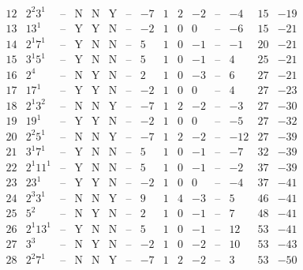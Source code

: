 \documentclass[11pt,reqno,a4letter]{article}
\numberwithin{figure}{section}
\numberwithin{table}{section}
\theoremstyle{plain}
\numberwithin{theorem}{section}
\theoremstyle{definition}
\begin{document}
\begin{table}[h!]
\begin{equation*}
{\begin{array}{|cc|c|ccc|c|c|ccc|c|ccc}
 12 & 2^2 3^1 & \text{--} & \text{N} & \text{N} & \text{Y} & \text{--} & -7 & 1 & 2 & -2 & \text{--} & -4 & 15 & -19 \\
 13 & 13^1 & \text{--} & \text{Y} & \text{Y} & \text{N} & \text{--} & -2 & 1 & 0 & 0 & \text{--} & -6 & 15 & -21 \\
 14 & 2^1 7^1 & \text{--} & \text{Y} & \text{N} & \text{N} & \text{--} & 5 & 1 & 0 & -1 & \text{--} & -1 & 20 & -21 \\
 15 & 3^1 5^1 & \text{--} & \text{Y} & \text{N} & \text{N} & \text{--} & 5 & 1 & 0 & -1 & \text{--} & 4 & 25 & -21 \\
 16 & 2^4 & \text{--} & \text{N} & \text{Y} & \text{N} & \text{--} & 2 & 1 & 0 & -3 & \text{--} & 6 & 27 & -21 \\
 17 & 17^1 & \text{--} & \text{Y} & \text{Y} & \text{N} & \text{--} & -2 & 1 & 0 & 0 & \text{--} & 4 & 27 & -23 \\
 18 & 2^1 3^2 & \text{--} & \text{N} & \text{N} & \text{Y} & \text{--} & -7 & 1 & 2 & -2 & \text{--} & -3 & 27 & -30 \\
 19 & 19^1 & \text{--} & \text{Y} & \text{Y} & \text{N} & \text{--} & -2 & 1 & 0 & 0 & \text{--} & -5 & 27 & -32 \\
 20 & 2^2 5^1 & \text{--} & \text{N} & \text{N} & \text{Y} & \text{--} & -7 & 1 & 2 & -2 & \text{--} & -12 & 27 & -39 \\
 21 & 3^1 7^1 & \text{--} & \text{Y} & \text{N} & \text{N} & \text{--} & 5 & 1 & 0 & -1 & \text{--} & -7 & 32 & -39 \\
 22 & 2^1 11^1 & \text{--} & \text{Y} & \text{N} & \text{N} & \text{--} & 5 & 1 & 0 & -1 & \text{--} & -2 & 37 & -39 \\
 23 & 23^1 & \text{--} & \text{Y} & \text{Y} & \text{N} & \text{--} & -2 & 1 & 0 & 0 & \text{--} & -4 & 37 & -41 \\
 24 & 2^3 3^1 & \text{--} & \text{N} & \text{N} & \text{Y} & \text{--} & 9 & 1 & 4 & -3 & \text{--} & 5 & 46 & -41 \\
 25 & 5^2 & \text{--} & \text{N} & \text{Y} & \text{N} & \text{--} & 2 & 1 & 0 & -1 & \text{--} & 7 & 48 & -41 \\
 26 & 2^1 13^1 & \text{--} & \text{Y} & \text{N} & \text{N} & \text{--} & 5 & 1 & 0 & -1 & \text{--} & 12 & 53 & -41 \\
 27 & 3^3 & \text{--} & \text{N} & \text{Y} & \text{N} & \text{--} & -2 & 1 & 0 & -2 & \text{--} & 10 & 53 & -43 \\
 28 & 2^2 7^1 & \text{--} & \text{N} & \text{N} & \text{Y} & \text{--} & -7 & 1 & 2 & -2 & \text{--} & 3 & 53 & -50 \\

\end{array}}
\end{equation*}
\end{table}
\end{document}
